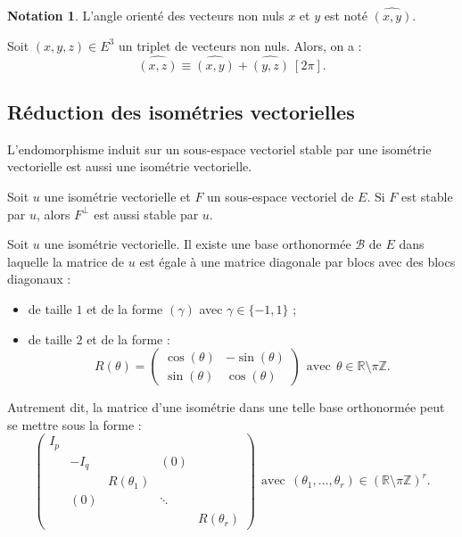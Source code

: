 \documentclass[french]{article}
\newcommand{\Z}{\mathbb{Z}}
\newcommand{\R}{\mathbb{R}}
\theoremstyle{plain}
\theoremstyle{definition}
\newtheorem*{notation}{Notation}
\theoremstyle{remark}
\begin{document}
\begin{notation}
	L'angle orienté des vecteurs non nuls $x$ et $y$ est noté $\widehat{(x,y)}$.
\end{notation}

\begin{prop}
	Soit $(x,y,z)\in E^3$ un triplet de vecteurs non nuls. Alors, on a : $$\widehat{(x,z)}\equiv\widehat{(x,y)}+\widehat{(y,z)}\ [2\pi].$$
\end{prop}

\subsection{Réduction des isométries vectorielles}

\begin{lem}
	L'endomorphisme induit sur un sous-espace vectoriel stable par une isométrie vectorielle est aussi une isométrie vectorielle.
\end{lem}

\begin{prop}
	Soit $u$ une isométrie vectorielle et $F$ un sous-espace vectoriel de $E$. Si $F$ est stable par $u$, alors $F^\bot$ est aussi stable par $u$.
\end{prop}

\begin{thm}
	Soit $u$ une isométrie vectorielle. Il existe une base orthonormée $\mathcal{B}$ de $E$ dans laquelle la matrice de $u$ est égale à une matrice diagonale par blocs avec des blocs diagonaux :
	\begin{itemize}
		\item de taille $1$ et de la forme $(\gamma)$ avec $\gamma\in\{-1,1\}$ ;
		\item de taille $2$ et de la forme : $$R(\theta)=\begin{pmatrix}
			\cos(\theta)&-\sin(\theta)\\
			\sin(\theta)&\cos(\theta)
		\end{pmatrix}\ \ \text{avec}\ \ \theta\in\R\setminus\pi\Z.$$
	\end{itemize}
\end{thm}

Autrement dit, la matrice d'une isométrie dans une telle base orthonormée peut se mettre sous la forme : $$\begin{pmatrix}
	I_p&&&&\\
	&-I_q&&(0)&\\
	&&R(\theta_1)&&\\
	&(0)&&\ddots&\\
	&&&&R(\theta_r)
\end{pmatrix}\ \ \text{avec}\ \ (\theta_1,\ldots,\theta_r)\in\left(\R\setminus\pi\Z\right)^r.$$
\end{document}

